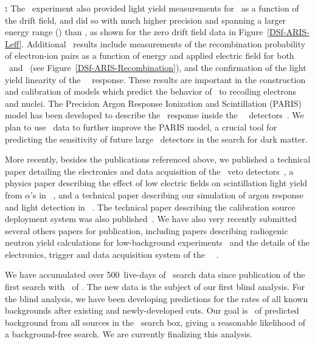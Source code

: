 \begin{compactitem}
\item {\bf \ARIS:} The \ARIS\ experiment also provided light yield measurements for \NRs\ as a function of the drift field, and did so with much higher precision and spanning a larger energy range (\ARISRecoilsLightEnergyRange) than \SCENE, as shown for the zero drift field data in Figure~\ref{DSf-ARIS-Leff}.  Additional \ARIS\ results include measurements of the recombination probability of electron-ion pairs as a function of energy and applied electric field for both \ERs\ and \NRs\ (see Figure~\ref{DSf-ARIS-Recombination}), and the confirmation of the light yield linearity of the \LAr\ \ER\ response. These results are important in the construction and calibration of models which predict the behavior of \LAr\ to recoiling electrons and nuclei. The Precision Argon Response Ionization and Scintillation (PARIS) model has been developed to describe the \LAr\ response inside the \DS\ \LArTPC\ detectors~\cite{Agnes:2017ug}. We plan to use \ARIS\ data to further improve the PARIS model, a crucial tool for predicting the sensitivity of future large \LAr\ detectors in the search for dark matter.

\end{compactitem}

More recently, besides the publications referenced above, we published a technical paper detailing the electronics and data acquisition of the \DSfs\ veto detectors~\cite{Agnes:2016cp}, a physics paper describing the effect of low electric fields on scintillation light yield from $\alpha$'s in \LAr~\cite{Agnes:2017cl}, and a technical paper describing our simulation of argon response and light detection in \DSfs~\cite{Agnes:2017ug}.  The technical paper describing the calibration source deployment system was also published~\cite{Agnes:2016ur}.  We have also very recently submitted several others papers for publication, including papers describing radiogenic neutron yield calculations for low-background experiments~\cite{Westerdale:2017vr} and the details of the electronics, trigger and data acquisition system of the \DSfs\ \LArTPC~\cite{Agnes:2017wf}. 

We have accumulated over \num{500}~live-days of \WIMP\ search data since publication of the first search with \DSfUArLiveDay\ of \UAr.  The new data is the subject of our first blind analysis.  For the blind analysis, we have been developing predictions for the rates of all known backgrounds after existing and newly-developed cuts.  Our goal is \BackgroundFreeRequirement\ of predicted background from all sources in the \WIMP\ search box, giving a reasonable likelihood of a background-free search.  We are currently finalizing this analysis.


